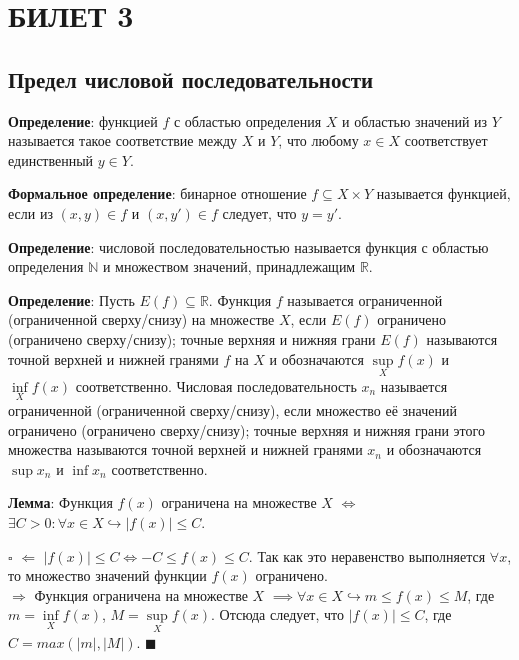 \documentclass[12pt, a4paper, reqno]{article}
\begin{document}
\newpage
\section{БИЛЕТ 3}

\subsection{Предел числовой последовательности}

    \textbf{Определение}: функцией $f$ с областью определения $X$ и областью значений из $Y$
    называется такое соответствие между $X$ и $Y$, что любому $x\in X$ соответствует единственный
    $y\in Y$.

    \textbf{Формальное определение}: бинарное отношение $f\subseteq X\times Y$ называется функцией,
    если из $(x, y)\in f$ и $(x, y')\in f$ следует, что $y = y'$.

    \textbf{Определение}: числовой последовательностью называется функция с областью определения
    $\mathbb{N}$ и множеством значений, принадлежащим $\mathbb{R}$.

    \textbf{Определение}: Пусть $E(f) \subseteq \mathbb{R}$. Функция $f$ называется ограниченной
    (ограниченной сверху/снизу) на множестве $X$, если $E(f)$ ограничено (ограничено сверху/снизу);
    точные верхняя и нижняя грани $E(f)$ называются точной верхней и нижней гранями $f$ на $X$ и
    обозначаются $\sup\limits_X f(x)$ и $\inf\limits_X f(x)$ соответственно. Числовая последовательность
    $x_n$ называется ограниченной (ограниченной сверху/снизу), если множество её значений ограничено
    (ограничено сверху/снизу); точные верхняя и нижняя грани этого множества называются точной
    верхней и нижней гранями $x_n$ и обозначаются $\sup x_n$ и $\inf x_n$ соответственно.

    \textbf{Лемма}: Функция $f(x)$ ограничена на множестве $X$ $\iff$ $\exists C > 0: \forall x\in X
    \hookrightarrow |f(x)| \leq C$.

    $\square$ $\boxed{\Leftarrow}$ $|f(x)| \leq C \iff -C \leq f(x) \leq C$. Так как это неравенство
    выполняется $\forall x$, то множество значений функции $f(x)$ ограничено.\\
    $\boxed{\Rightarrow}$ Функция ограничена на множестве $X$ $\implies\forall x\in X\hookrightarrow m
    \leq f(x) \leq M$, где $m = \inf\limits_X f(x)$, $M = \sup\limits_X f(x)$. Отсюда следует, что
    $|f(x)| \leq C$, где $C = max(|m|, |M|)$. $\blacksquare$
\end{document}
